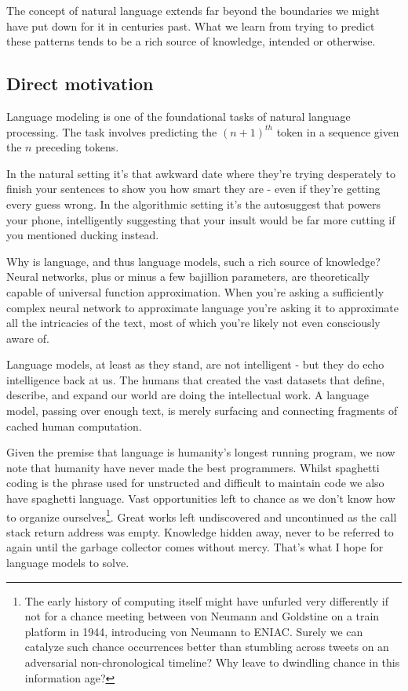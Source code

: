 \documentclass{article}
\begin{document}
The concept of natural language extends far beyond the boundaries we might have put down for it in centuries past.
What we learn from trying to predict these patterns tends to be a rich source of knowledge, intended or otherwise.

\subsection{Direct motivation}

Language modeling is one of the foundational tasks of natural language processing.
The task involves predicting the $(n+1)^{th}$ token in a sequence given the $n$ preceding tokens.

In the natural setting it's that awkward date where they're trying desperately to finish your sentences to show you how smart they are - even if they're getting every guess wrong.
In the algorithmic setting it's the autosuggest that powers your phone, intelligently suggesting that your insult would be far more cutting if you mentioned ducking instead.



Why is language, and thus language models, such a rich source of knowledge?
Neural networks, plus or minus a few bajillion parameters, are theoretically capable of universal function approximation.
When you're asking a sufficiently complex neural network to approximate language you're asking it to approximate all the intricacies of the text, most of which you're likely not even consciously aware of.

Language models, at least as they stand, are not intelligent - but they do echo intelligence back at us.
The humans that created the vast datasets that define, describe, and expand our world are doing the intellectual work.
A language model, passing over enough text, is merely surfacing and connecting fragments of cached human computation.

Given the premise that language is humanity's longest running program, we now note that humanity have never made the best programmers.
Whilst spaghetti coding is the phrase used for unstructed and difficult to maintain code we also have spaghetti language.
Vast opportunities left to chance as we don't know how to organize ourselves\footnote{The early history of computing itself might have unfurled very differently if not for a chance meeting between von Neumann and Goldstine on a train platform in 1944, introducing von Neumann to ENIAC. Surely we can catalyze such chance occurrences better than stumbling across tweets on an adversarial non-chronological timeline? Why leave to dwindling chance in this information age?}.
Great works left undiscovered and uncontinued as the call stack return address was empty.
Knowledge hidden away, never to be referred to again until the garbage collector comes without mercy.
That's what I hope for language models to solve.
\end{document}
